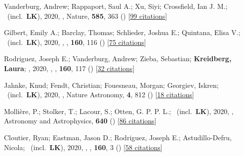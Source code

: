 \item[{\color{numcolor}\scriptsize40}] Vanderburg, Andrew; Rappaport, Saul A.; Xu, Siyi; Crossfield, Ian J. M.; \etal\ (incl.\ \textbf{LK}), 2020, , Nature, \textbf{585}, 363 () [\href{https://ui.adsabs.harvard.edu/abs/2020Natur.585..363V}{99 citations}]

\item[{\color{numcolor}\scriptsize39}] Gilbert, Emily A.; Barclay, Thomas; Schlieder, Joshua E.; Quintana, Elisa V.; \etal\ (incl.\ \textbf{LK}), 2020, , \aj, \textbf{160}, 116 () [\href{https://ui.adsabs.harvard.edu/abs/2020AJ....160..116G}{75 citations}]

\item[{\color{numcolor}\scriptsize38}] Rodriguez, Joseph E.; Vanderburg, Andrew; Zieba, Sebastian; \textbf{Kreidberg, Laura}; \etal, 2020, , \aj, \textbf{160}, 117 () [\href{https://ui.adsabs.harvard.edu/abs/2020AJ....160..117R}{32 citations}]

\item[{\color{numcolor}\scriptsize37}] Jahnke, Knud; Fendt, Christian; Fouesneau, Morgan; Georgiev, Iskren; \etal\ (incl.\ \textbf{LK}), 2020, , Nature Astronomy, \textbf{4}, 812 () [\href{https://ui.adsabs.harvard.edu/abs/2020NatAs...4..812J}{18 citations}]

\item[{\color{numcolor}\scriptsize36}] Molli{\`e}re, P.; Stolker, T.; Lacour, S.; Otten, G. P. P. L.; \etal\ (incl.\ \textbf{LK}), 2020, , Astronomy and Astrophysics, \textbf{640} () [\href{https://ui.adsabs.harvard.edu/abs/2020A&A...640A.131M}{86 citations}]

\item[{\color{numcolor}\scriptsize35}] Cloutier, Ryan; Eastman, Jason D.; Rodriguez, Joseph E.; Astudillo-Defru, Nicola; \etal\ (incl.\ \textbf{LK}), 2020, , \aj, \textbf{160}, 3 () [\href{https://ui.adsabs.harvard.edu/abs/2020AJ....160....3C}{58 citations}]

